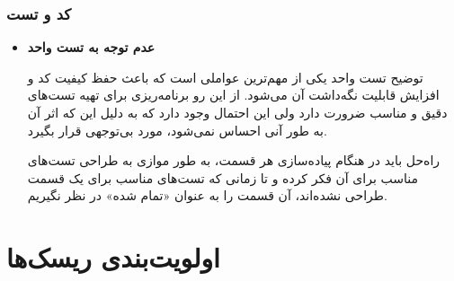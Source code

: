 \subsubsection{کد و تست}



\begin{itemize}
	
	
	\item 
	\textbf{عدم توجه به تست واحد}
	
	
	توضیح \hspace*{1cm} 
تست واحد یکی از مهم‌ترین عواملی است که باعث حفظ کیفیت کد و افزایش قابلیت نگه‌داشت آن می‌شود. از این رو برنامه‌ریزی برای تهیه تست‌های دقیق و مناسب ضرورت دارد ولی این احتمال وجود دارد که به دلیل این که اثر آن به طور آنی احساس نمی‌شود، مورد بی‌توجهی قرار بگیرد.
	
	راه‌حل \hspace*{1cm} 
باید در هنگام پیاده‌سازی هر قسمت، به طور موازی به طراحی تست‌های مناسب برای آن فکر کرده و تا زمانی که تست‌های مناسب برای یک قسمت طراحی نشده‌اند، آن قسمت را به عنوان «تمام شده»‌ در نظر نگیریم.
	
	
	
	
\end{itemize}


\section{اولویت‌بندی ریسک‌ها}

